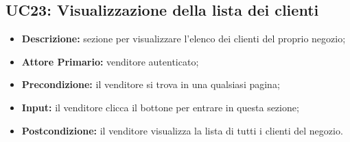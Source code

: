 \subsection{UC23: Visualizzazione della lista dei clienti}
\label{sec:UC23}
\begin{itemize}
    \item \textbf{Descrizione:} sezione per visualizzare l'elenco dei clienti del proprio negozio;
    \item \textbf{Attore Primario:} venditore autenticato; 
    \item \textbf{Precondizione:} il venditore si trova in una qualsiasi pagina;
    \item \textbf{Input:} il venditore clicca il bottone per entrare in questa sezione; 
    \item \textbf{Postcondizione:} il venditore visualizza la lista di tutti i clienti del negozio.
\end{itemize}